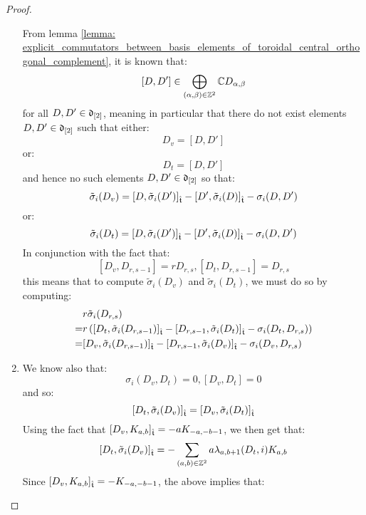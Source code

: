 \begin{proof}
\begin{enumerate}
                    From lemma \ref{lemma: explicit_commutators_between_basis_elements_of_toroidal_central_orthogonal_complement}, it is known that:
                        $$[D, D'] \in \bigoplus_{(\alpha, \beta) \in \mathbb{Z}^2} \mathbb{C} D_{\alpha, \beta}$$
                    for all $D, D' \in \mathfrak{d}_{[2]}$, meaning in particular that there do not exist elements $D, D' \in \mathfrak{d}_{[2]}$ such that either:
                        $$D_v = [D, D']$$
                    or:
                        $$D_t = [D, D']$$
                    and hence no such elements $D, D' \in \mathfrak{d}_{[2]}$ so that:
                        $$\tilde{\sigma}_i(D_v) = [D, \tilde{\sigma}_i(D')]_{\hat{\mathfrak{t}}} - [D', \tilde{\sigma}_i(D)]_{\hat{\mathfrak{t}}} - \sigma_i(D, D')$$
                    or:
                        $$\tilde{\sigma}_i(D_t) = [D, \tilde{\sigma}_i(D')]_{\hat{\mathfrak{t}}} - [D', \tilde{\sigma}_i(D)]_{\hat{\mathfrak{t}}} - \sigma_i(D, D')$$
                    In conjunction with the fact that:
                        $$[D_v, D_{r, s - 1}] = r D_{r, s}, [D_t, D_{r, s - 1}] = D_{r, s}$$
                    this means that to compute $\tilde{\sigma}_i(D_v)$ and $\tilde{\sigma}_i(D_t)$, we must do so by computing:
                        $$
                            \begin{aligned}
                                & r\tilde{\sigma}_i(D_{r, s})
                                \\
                                = & r\left( [D_t, \tilde{\sigma}_i(D_{r, s - 1})]_{\hat{\mathfrak{t}}} - [D_{r, s - 1}, \tilde{\sigma}_i(D_t)]_{\hat{\mathfrak{t}}} - \sigma_i(D_t, D_{r, s}) \right)
                                \\
                                = & [D_v, \tilde{\sigma}_i(D_{r, s - 1})]_{\hat{\mathfrak{t}}} - [D_{r, s - 1}, \tilde{\sigma}_i(D_v)]_{\hat{\mathfrak{t}}} - \sigma_i(D_v, D_{r, s})
                            \end{aligned}
                        $$
                    \item We know also that:
                        $$\sigma_i(D_v, D_t) = 0, [D_v, D_t] = 0$$
                    and so:
                        $$[D_t, \tilde{\sigma}_i(D_v)]_{\hat{\mathfrak{t}}} = [D_v, \tilde{\sigma}_i(D_t)]_{\hat{\mathfrak{t}}}$$
                    Using the fact that $[D_v, K_{a, b}]_{\hat{\mathfrak{t}}} = -a K_{-a, -b - 1}$, we then get that:
                        $$[D_t, \tilde{\sigma}_i(D_v)]_{\hat{\mathfrak{t}}} = -\sum_{(a, b) \in \mathbb{Z}^2} a \lambda_{a, b + 1}(D_t, i) K_{a, b}$$
                    Since $[D_v, K_{a, b}]_{\hat{\mathfrak{t}}} = -K_{-a, -b - 1}$, the above implies that:

\end{enumerate}
\end{proof}

